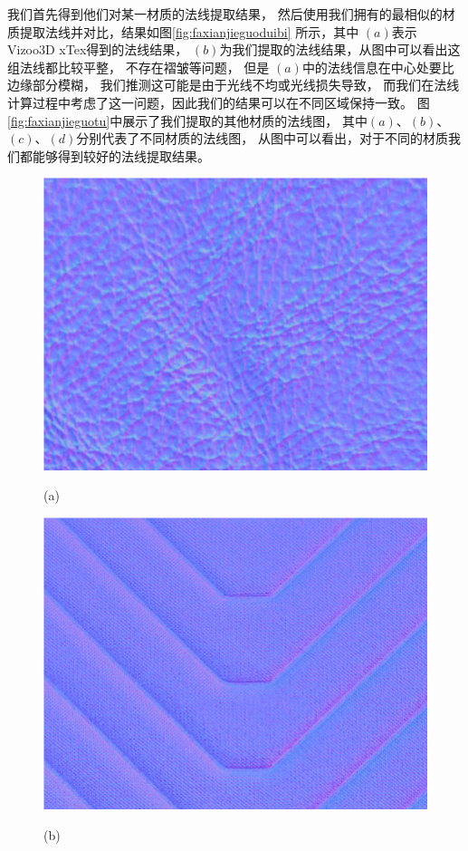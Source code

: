 我们首先得到他们对某一材质的法线提取结果，
然后使用我们拥有的最相似的材质提取法线并对比，结果如图\ref{fig:faxianjieguoduibi}
所示，其中
$(a)$表示Vizoo3D xTex得到的法线结果，
$(b)$为我们提取的法线结果，从图中可以看出这组法线都比较平整，
不存在褶皱等问题，
但是
$(a)$中的法线信息在中心处要比边缘部分模糊，
我们推测这可能是由于光线不均或光线损失导致，
而我们在法线计算过程中考虑了这一问题，因此我们的结果可以在不同区域保持一致。
图\ref{fig:faxianjieguotu}中展示了我们提取的其他材质的法线图，
其中$(a)$、$(b)$、$(c)$、$(d)$分别代表了不同材质的法线图，
从图中可以看出，对于不同的材质我们都能够得到较好的法线提取结果。
\begin{figure}[htbp]
\begin{minipage}{0.48\linewidth}
\centerline{\includegraphics[width=1.0\linewidth]{figures/faxianjieguotua.png}}
\centerline{(a)}
\end{minipage}
\begin{minipage}{0.48\linewidth}
\centerline{\includegraphics[width=1.0\linewidth]{figures/faxianjieguotub.png}}
\centerline{(b)}
\end{minipage}


\end{figure}
